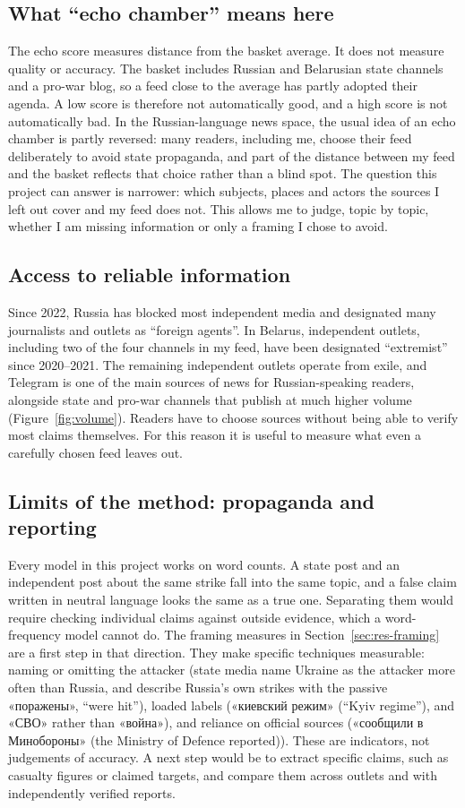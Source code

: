 \documentclass[11pt,a4paper]{article}
\newcommand{\ru}[2]{«#1» (#2)}
\begin{document}
\subsection{What ``echo chamber'' means here}
The echo score measures distance from the basket average. It does not measure quality or accuracy. The basket includes Russian and Belarusian state channels and a pro-war blog, so a feed close to the average has partly adopted their agenda. A low score is therefore not automatically good, and a high score is not automatically bad. In the Russian-language news space, the usual idea of an echo chamber is partly reversed: many readers, including me, choose their feed deliberately to avoid state propaganda, and part of the distance between my feed and the basket reflects that choice rather than a blind spot. The question this project can answer is narrower: which subjects, places and actors the sources I left out cover and my feed does not. This allows me to judge, topic by topic, whether I am missing information or only a framing I chose to avoid.

\subsection{Access to reliable information}
Since 2022, Russia has blocked most independent media and designated many journalists and outlets as ``foreign agents''. In Belarus, independent outlets, including two of the four channels in my feed, have been designated ``extremist'' since 2020--2021. The remaining independent outlets operate from exile, and Telegram is one of the main sources of news for Russian-speaking readers, alongside state and pro-war channels that publish at much higher volume (Figure~\ref{fig:volume}). Readers have to choose sources without being able to verify most claims themselves. For this reason it is useful to measure what even a carefully chosen feed leaves out.

\subsection{Limits of the method: propaganda and reporting}
Every model in this project works on word counts. A state post and an independent post about the same strike fall into the same topic, and a false claim written in neutral language looks the same as a true one. Separating them would require checking individual claims against outside evidence, which a word-frequency model cannot do. The framing measures in Section~\ref{sec:res-framing} are a first step in that direction. They make specific techniques measurable: naming or omitting the attacker (state media name Ukraine as the attacker more often than Russia, and describe Russia's own strikes with the passive «поражены», ``were hit''), loaded labels (\ru{киевский режим}{``Kyiv regime''}, and «СВО» rather than «война»), and reliance on official sources (\ru{сообщили в Минобороны}{the Ministry of Defence reported}). These are indicators, not judgements of accuracy. A next step would be to extract specific claims, such as casualty figures or claimed targets, and compare them across outlets and with independently verified reports.
\end{document}
